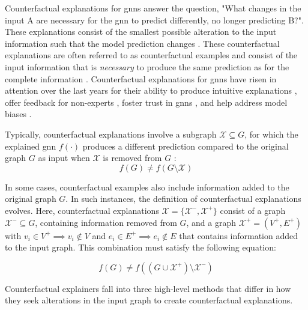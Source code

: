 Counterfactual explanations for \glspl{gnn} answer the question, "What changes in the input A are necessary for the \gls{gnn} to predict differently, no longer predicting B?". These explanations consist of the smallest possible alteration to the input information such that the model prediction changes \cite{kakkad_survey_2023}. These counterfactual explanations are often referred to as counterfactual examples and consist of the input information that is \textit{necessary} to produce the same prediction as for the complete information \cite{tan_learning_2022}. Counterfactual explanations for \glspl{gnn} have risen in attention over the last years \cite{ma_clear_2022} for their ability to produce intuitive explanations \cite{ma_clear_2022}, offer feedback for non-experts \cite{prado-romero_survey_2023}, foster trust in \glspl{gnn} \cite{prado-romero_survey_2023}, and help address model biases \cite{prado-romero_survey_2023}.

Typically, counterfactual explanations involve a subgraph $\mathcal{X} \subseteq G$, for which the explained \gls{gnn} $f(\cdot)$ produces a different prediction compared to the original graph $G$ as input when $\mathcal{X}$ is removed from $G$ \cite{tan_learning_2022}:
\begin{equation}
    \label{e_cf_explanation}
    f(G) \neq f(G\setminus \mathcal{X})
\end{equation}

In some cases, counterfactual examples also include information added to the original graph $G$. In such instances, the definition of counterfactual explanations evolves. Here, counterfactual explanations $\mathcal{X} = \{\mathcal{X}^-, \mathcal{X}^+\}$ consist of a graph $\mathcal{X}^- \subseteq G$, containing information removed from $G$, and a graph $\mathcal{X}^+ = (V^+, E^+)$ with ${v_i \in V^+ \implies v_i \notin V}$ and $e_i \in E^+ \implies e_i \notin E$ that contains information added to the input graph. This combination must satisfy the following equation:

\begin{equation}
    f(G) \neq f((G \cup \mathcal{X}^+) \setminus \mathcal{X^-})
\end{equation}

Counterfactual explainers fall into three high-level methods that differ in how they seek alterations in the input graph to create counterfactual explanations.

